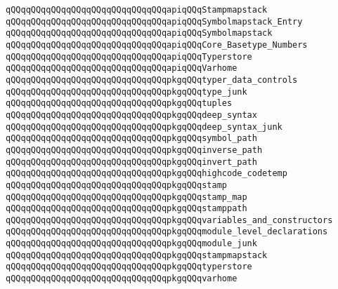 \verb|qQQqqQQqqQQqqQQqqQQqqQQqqQQqqQQqapiqQQqStampmapstack|\newline
\verb|qQQqqQQqqQQqqQQqqQQqqQQqqQQqqQQqapiqQQqSymbolmapstack_Entry|\newline
\verb|qQQqqQQqqQQqqQQqqQQqqQQqqQQqqQQqapiqQQqSymbolmapstack|\newline
\verb|qQQqqQQqqQQqqQQqqQQqqQQqqQQqqQQqapiqQQqCore_Basetype_Numbers|\newline
\verb|qQQqqQQqqQQqqQQqqQQqqQQqqQQqqQQqapiqQQqTyperstore|\newline
\verb|qQQqqQQqqQQqqQQqqQQqqQQqqQQqqQQqapiqQQqVarhome|\newline
\newline
\verb|qQQqqQQqqQQqqQQqqQQqqQQqqQQqqQQqpkgqQQqtyper_data_controls|\newline
\verb|qQQqqQQqqQQqqQQqqQQqqQQqqQQqqQQqpkgqQQqtype_junk|\newline
\verb|qQQqqQQqqQQqqQQqqQQqqQQqqQQqqQQqpkgqQQqtuples|\newline
\verb|qQQqqQQqqQQqqQQqqQQqqQQqqQQqqQQqpkgqQQqdeep_syntax|\newline
\verb|qQQqqQQqqQQqqQQqqQQqqQQqqQQqqQQqpkgqQQqdeep_syntax_junk|\newline
\verb|qQQqqQQqqQQqqQQqqQQqqQQqqQQqqQQqpkgqQQqsymbol_path|\newline
\verb|qQQqqQQqqQQqqQQqqQQqqQQqqQQqqQQqpkgqQQqinverse_path|\newline
\verb|qQQqqQQqqQQqqQQqqQQqqQQqqQQqqQQqpkgqQQqinvert_path|\newline
\verb|qQQqqQQqqQQqqQQqqQQqqQQqqQQqqQQqpkgqQQqhighcode_codetemp|\newline
\verb|qQQqqQQqqQQqqQQqqQQqqQQqqQQqqQQqpkgqQQqstamp|\newline
\verb|qQQqqQQqqQQqqQQqqQQqqQQqqQQqqQQqpkgqQQqstamp_map|\newline
\verb|qQQqqQQqqQQqqQQqqQQqqQQqqQQqqQQqpkgqQQqstamppath|\newline
\verb|qQQqqQQqqQQqqQQqqQQqqQQqqQQqqQQqpkgqQQqvariables_and_constructors|\newline
\verb|qQQqqQQqqQQqqQQqqQQqqQQqqQQqqQQqpkgqQQqmodule_level_declarations|\newline
\verb|qQQqqQQqqQQqqQQqqQQqqQQqqQQqqQQqpkgqQQqmodule_junk|\newline
\verb|qQQqqQQqqQQqqQQqqQQqqQQqqQQqqQQqpkgqQQqstampmapstack|\newline
\verb|qQQqqQQqqQQqqQQqqQQqqQQqqQQqqQQqpkgqQQqtyperstore|\newline
\verb|qQQqqQQqqQQqqQQqqQQqqQQqqQQqqQQqpkgqQQqvarhome|\newline
